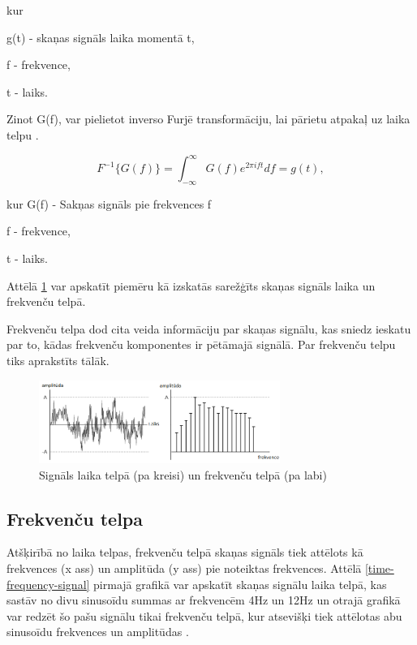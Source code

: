 \documentclass[12pt,paper=A4]{report}
\begin{document}
kur 

g(t) - skaņas signāls laika momentā t,

f - frekvence,

t - laiks.

Zinot G(f), var pielietot inverso Furjē transformāciju, lai pārietu atpakaļ uz laika telpu \cite{http://www.thefouriertransform.com/transform/fourier.php}. 

\begin{equation}
F^{-1} \{G(f)\} = \int_{-\infty}^\infty G(f)e^{2\pi ift} df = g(t),
\end{equation}

kur 
G(f) - Sakņas signāls pie frekvences f

f - frekvence,

t - laiks.

Attēlā \ref{complex-signal} var apskatīt piemēru kā izskatās sarežģīts skaņas signāls laika un frekvenču telpā. 

Frekvenču telpa dod cita veida informāciju par skaņas signālu, kas sniedz ieskatu par to, kādas frekvenču komponentes ir pētāmajā signālā. Par frekvenču telpu tiks aprakstīts tālāk. 


\begin{figure}[H] \centering
\includegraphics[width=0.70\textwidth]{act} 
\caption{Signāls laika telpā (pa kreisi) un frekvenču telpā (pa labi) \cite{http://www.erzetich-audio.com/knowledgebase-05-time-vs-frequency}}  \label{complex-signal} 
\end{figure}

\FloatBarrier
\subsection{Frekvenču telpa}


Atšķirībā no laika telpas, frekvenču telpā skaņas signāls tiek attēlots kā frekvences (x ass) un amplitūda (y ass) pie noteiktas frekvences. Attēlā \ref{time-frequency-signal} pirmajā grafikā var apskatīt skaņas signālu laika telpā, kas sastāv no divu sinusoīdu summas ar frekvencēm 4Hz un 12Hz un otrajā grafikā var redzēt šo pašu signālu tikai frekvenču telpā, kur atsevišķi tiek attēlotas abu sinusoīdu frekvences un amplitūdas \cite{http://www.theparticle.com/cs/bc/mcs/signalnotes.pdf}.
\end{document}
